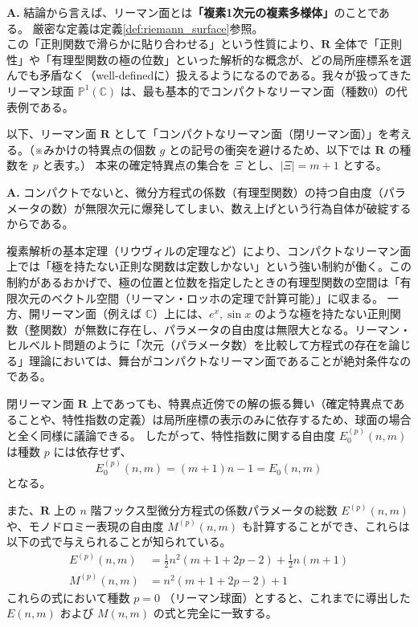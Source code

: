 \begin{Q}
\textbf{A.} 結論から言えば、リーマン面とは\textbf{「複素1次元の複素多様体」}のことである。
厳密な定義は定義\ref{def:riemann_surface}参照。\\
この「正則関数で滑らかに貼り合わせる」という性質により、$\mathbf{R}$ 全体で「正則性」や「有理型関数の極の位数」といった解析的な概念が、どの局所座標系を選んでも矛盾なく（well-definedに）扱えるようになるのである。我々が扱ってきたリーマン球面 $\mathbb{P}^1(\mathbb{C})$ は、最も基本的でコンパクトなリーマン面（種数0）の代表例である。
\end{Q}

以下、リーマン面 $\mathbf{R}$ として「コンパクトなリーマン面（閉リーマン面）」を考える。（※みかけの特異点の個数 $g$ との記号の衝突を避けるため、以下では $\mathbf{R}$ の種数を $p$ と表す。）
本来の確定特異点の集合を $\Xi$ とし、$|\Xi| = m+1$ とする。

\begin{Q}
\textbf{A.} コンパクトでないと、微分方程式の係数（有理型関数）の持つ自由度（パラメータの数）が無限次元に爆発してしまい、数え上げという行為自体が破綻するからである。

複素解析の基本定理（リウヴィルの定理など）により、コンパクトなリーマン面上では「極を持たない正則な関数は定数しかない」という強い制約が働く。この制約があるおかげで、極の位置と位数を指定したときの有理型関数の空間は「有限次元のベクトル空間（リーマン・ロッホの定理で計算可能）」に収まる。
一方、開リーマン面（例えば $\mathbb{C}$）上には、$e^x, \sin x$ のような極を持たない正則関数（整関数）が無数に存在し、パラメータの自由度は無限大となる。リーマン・ヒルベルト問題のように「次元（パラメータ数）を比較して方程式の存在を論じる」理論においては、舞台がコンパクトなリーマン面であることが絶対条件なのである。
\end{Q}

閉リーマン面 $\mathbf{R}$ 上であっても、特異点近傍での解の振る舞い（確定特異点であることや、特性指数の定義）は局所座標の表示のみに依存するため、球面の場合と全く同様に議論できる。
したがって、特性指数に関する自由度 $E_{0}^{(p)}(n,m)$ は種数 $p$ には依存せず、
\[
E_{0}^{(p)}(n,m) = (m+1)n - 1 = E_{0}(n,m)
\]
となる。

また、$\mathbf{R}$ 上の $n$ 階フックス型微分方程式の係数パラメータの総数 $E^{(p)}(n,m)$ や、モノドロミー表現の自由度 $M^{(p)}(n,m)$ も計算することができ、これらは以下の式で与えられることが知られている。
\begin{align}
E^{(p)}(n,m) &= \frac{1}{2}n^{2}(m+1+2p-2) + \frac{1}{2}n(m+1)\\
M^{(p)}(n,m) &= n^{2}(m+1+2p-2) + 1
\end{align}
これらの式において種数 $p=0$ （リーマン球面）とすると、これまでに導出した $E(n,m)$ および $M(n,m)$ の式と完全に一致する。

